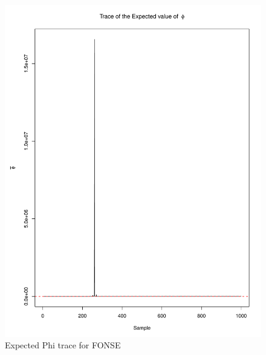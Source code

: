\documentclass[11pt]{labbook}
\begin{document}
    \begin{figure}
        \centering
        \includegraphics[scale=.65]{FONSE_Plots/2016/July_27/ExpectedPhiTrace}
        \caption{Expected Phi trace for FONSE}
        \label{fig:JULY27_EPHI}
    \end{figure}
\end{document}
